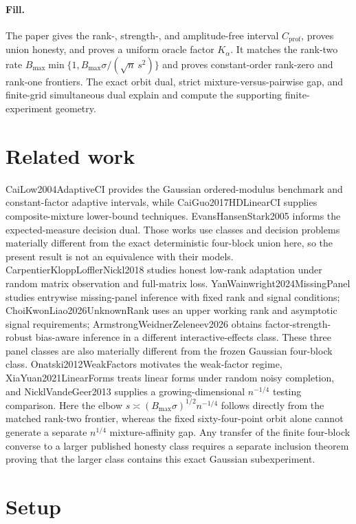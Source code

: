 \documentclass{article}
\begin{document}
\paragraph{Fill.} The paper gives the rank-, strength-, and amplitude-free interval \(C_{\mathrm{prof}}\), proves union honesty, and proves a uniform oracle factor \(K_\alpha\). It matches the rank-two rate \(B_{\max}\min\{1,B_{\max}\sigma/(\sqrt n\,s^2)\}\) and proves constant-order rank-zero and rank-one frontiers. The exact orbit dual, strict mixture-versus-pairwise gap, and finite-grid simultaneous dual explain and compute the supporting finite-experiment geometry.

\section{Related work}

CaiLow2004AdaptiveCI provides the Gaussian ordered-modulus benchmark and constant-factor adaptive intervals, while CaiGuo2017HDLinearCI supplies composite-mixture lower-bound techniques. EvansHansenStark2005 informs the expected-measure decision dual. Those works use classes and decision problems materially different from the exact deterministic four-block union here, so the present result is not an equivalence with their models. CarpentierKloppLofflerNickl2018 studies honest low-rank adaptation under random matrix observation and full-matrix loss. YanWainwright2024MissingPanel studies entrywise missing-panel inference with fixed rank and signal conditions; ChoiKwonLiao2026UnknownRank uses an upper working rank and asymptotic signal requirements; ArmstrongWeidnerZeleneev2026 obtains factor-strength-robust bias-aware inference in a different interactive-effects class. These three panel classes are also materially different from the frozen Gaussian four-block class. Onatski2012WeakFactors motivates the weak-factor regime, XiaYuan2021LinearForms treats linear forms under random noisy completion, and NicklVandeGeer2013 supplies a growing-dimensional \(n^{-1/4}\) testing comparison. Here the elbow \(s\asymp(B_{\max}\sigma)^{1/2}n^{-1/4}\) follows directly from the matched rank-two frontier, whereas the fixed sixty-four-point orbit alone cannot generate a separate \(n^{1/4}\) mixture-affinity gap. Any transfer of the finite four-block converse to a larger published honesty class requires a separate inclusion theorem proving that the larger class contains this exact Gaussian subexperiment.

\section{Setup}
\end{document}
